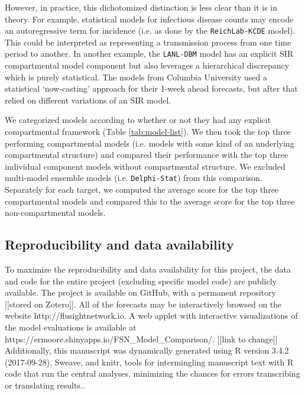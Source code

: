 \documentclass{article}
\begin{document}
However, in practice, this dichotomized distinction is less clear than it is in theory.
For example, statistical models for infectious disease counts may encode an autoregressive term for incidence (i.e. as done by the {\tt ReichLab-KCDE} model).
This could be interpreted as representing a transmission process from one time period to another.
In another example, the {\tt LANL-DBM} model has an explicit SIR compartmental model component but also leverages a hierarchical discrepancy which is purely statistical.
The models from Columbia University used a statistical `now-casting' approach for their 1-week ahead forecasts, but after that relied on different variations of an SIR model.

We categorized models according to whether or not they had any explicit compartmental framework (Table \ref{tab:model-list}). 
We then took the top three performing compartmental models (i.e. models with some kind of an underlying compartmental structure) and compared their performance with the top three individual component models without compartmental structure. 
We excluded multi-model ensemble models (i.e. {\tt Delphi-Stat}) from this comparison.
Separately for each target, we computed the average score for the top three compartmental models and compared this to the average score for the top three non-compartmental models.

\subsection{Reproducibility and data availability}

To maximize the reproducibility and data availability for this project, the data and code for the entire project (excluding specific model code) are publicly available.
The project is available on GitHub\cite{fsngithub2018}, with a permanent repository [[stored on Zotero]].
All of the forecasts may be interactively browsed on the website http://flusightnetwork.io.
A web applet with interactive visualizations of the model evaluations is available at https://ermoore.shinyapps.io/FSN\_Model\_Comparison/. [[link to change]]
Additionally, this manuscript was dynamically generated using R version 3.4.2 (2017-09-28), Sweave, and knitr, tools for intermingling manuscript text with R code that run the central analyses, minimizing the chances for errors transcribing or translating results.\cite{Xie2015,RCore2017}.
\end{document}
